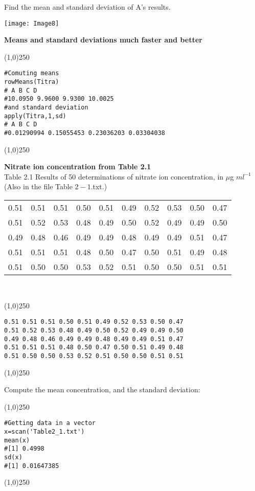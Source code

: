 Find the mean and standard deviation of A's results.

\begin{center}
	\texttt{[image: Image8]}
\end{center}


\textbf{Means and standard deviations much faster and better}
\begin{center}
	\line(1,0){250}
\end{center}
\begin{verbatim}
#Comuting means
rowMeans(Titra)
# A B C D
#10.0950 9.9600 9.9300 10.0025
#and standard deviation
apply(Titra,1,sd)
# A B C D
#0.01290994 0.15055453 0.23036203 0.03304038
\end{verbatim}
\begin{center}
	\line(1,0){250}
\end{center}
\newpage
\textbf{Nitrate ion concentration from Table 2.1}\\
Table 2.1 Results of 50 determinations of nitrate ion concentration, in $\mu$g $ml^{-1}$ (Also in the file Table $2-1$.txt.) \\
\begin{tabular}{|c|c|c|c|c|c|c|c|c|c|}
	\hline
	0.51 &0.51 &0.51 &0.50 &0.51 &0.49 &0.52 &0.53 &0.50 &0.47\\
	0.51 &0.52 &0.53 &0.48 &0.49 &0.50 &0.52 &0.49 &0.49 &0.50\\
	0.49 &0.48 &0.46 &0.49 &0.49 &0.48 &0.49 &0.49 &0.51 &0.47\\
	0.51 &0.51 &0.51 &0.48 &0.50 &0.47 &0.50 &0.51 &0.49 &0.48\\
	0.51 &0.50 &0.50 &0.53 &0.52 &0.51 &0.50 &0.50 &0.51 &0.51\\
	\hline
\end{tabular}\\ \bigskip

\begin{center}
	\line(1,0){250}
\end{center}
\begin{verbatim}
0.51 0.51 0.51 0.50 0.51 0.49 0.52 0.53 0.50 0.47
0.51 0.52 0.53 0.48 0.49 0.50 0.52 0.49 0.49 0.50
0.49 0.48 0.46 0.49 0.49 0.48 0.49 0.49 0.51 0.47
0.51 0.51 0.51 0.48 0.50 0.47 0.50 0.51 0.49 0.48
0.51 0.50 0.50 0.53 0.52 0.51 0.50 0.50 0.51 0.51
\end{verbatim}
\begin{center}
	\line(1,0){250}
\end{center}
Compute the mean concentration, and the standard deviation:
\begin{center}
	\line(1,0){250}
\end{center}
\begin{verbatim}
#Getting data in a vector
x=scan('Table2_1.txt')
mean(x)
#[1] 0.4998
sd(x)
#[1] 0.01647385
\end{verbatim}
\begin{center}
	\line(1,0){250}
\end{center}
\newpage